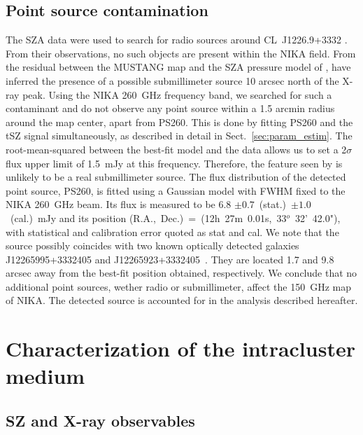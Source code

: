 \documentclass[twocolumn,traditabstract]{aa}
\begin{document}
\subsection{Point source contamination}\label{sec:point_source}
The SZA data were used to search for radio sources around \mbox{CL~J1226.9+3332} \citep{muchovej2007}. From their observations, no such objects are present within the NIKA field. From the residual between the MUSTANG map and the SZA pressure model of \cite{mroczkowski2009}, \cite{korngut2011} have inferred the presence of a possible submillimeter source 10 arcsec north of the \mbox{X-ray} peak. Using the NIKA 260~GHz frequency band, we searched for such a contaminant and do not observe any point source within a 1.5 arcmin radius around the map center, apart from PS260. This is done by fitting PS260 and the tSZ signal simultaneously, as described in detail in Sect.~\ref{sec:param_estim}. The root-mean-squared between the best-fit model and the data allows us to set a 2$\sigma$ flux upper limit of 1.5~mJy at this frequency. Therefore, the feature seen by \cite{korngut2011} is unlikely to be a real submillimeter source. The flux distribution of the detected point source, PS260, is fitted using a Gaussian model with FWHM fixed to the NIKA 260~GHz beam. Its flux is measured to be 6.8 $\pm 0.7$~(stat.)~$\pm 1.0$~(cal.)~mJy and its position (R.A.,~Dec.)~=~(12h~27m~0.01s,~33$^o$~32'~42.0"), with statistical and calibration error quoted as stat and cal. We note that the source possibly coincides with two known optically detected galaxies J12265995+3332405 and J12265923+3332405~\citep{holden2009}. They are located 1.7 and 9.8 arcsec away from the best-fit position obtained, respectively. We conclude that no additional point sources, wether radio or submillimeter, affect the 150~GHz map of NIKA. The detected source is accounted for in the analysis described hereafter.

\section{Characterization of the intracluster medium}\label{sec:analysis}
\subsection{SZ and X-ray observables}\label{sec:observables}
\end{document}
